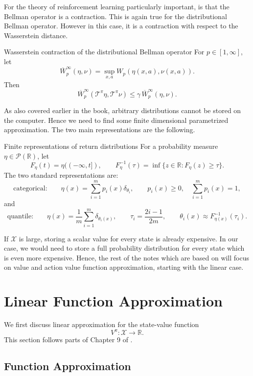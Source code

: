 \documentclass[12pt]{article}
\newcommand{\R}{\mathbb{R}}
\newcommand{\p}{\mathcal{P}}
\newcommand{\1}{\mathds{1}}
\newcommand{\X}{\mathcal{X}}
\newcommand{\T}{\mathcal{T}}
\begin{document}
For the theory of reinforcement learning particularly important, is that the Bellman operator is a contraction. This is again true for the distributional Bellman operator. However in this case, it is a contraction with respect to the Wasserstein distance.

\begin{theorem}{Wasserstein contraction of the distributional Bellman operator}{}
For $p\in[1,\infty]$, let
$$
  \overline W^\infty_p(\eta,\nu)
  =
  \sup_{x,a}
  W_p(\eta(x,a),\nu(x,a)).
$$
Then
$$
  \overline W^\infty_p(\T^\pi\eta,\T^\pi\nu)
  \leq
  \gamma\,\overline W^\infty_p(\eta,\nu).
$$
\end{theorem}
As also covered earlier in the book, arbitrary distributions cannot be stored on the computer. Hence we need to find some finite dimensional parametrized approximation. 
The two main representations are the following.

\begin{definition}{Finite representations of return distributions}{}
For a probability measure $\eta\in\p(\R)$, let
$$
  F_\eta(t)=\eta((-\infty,t]),
  \qquad
  F_\eta^{-1}(\tau)=\inf\{z\in\R:F_\eta(z)\geq\tau\}.
$$
The two standard representations are:
$$
  \text{categorical:}\qquad
  \eta(x)=\sum_{i=1}^m p_i(x)\delta_{\theta_i},
  \qquad
  p_i(x)\geq0,\quad \sum_{i=1}^m p_i(x)=1,
$$
and
$$
  \text{quantile:}\qquad
  \eta(x)=\frac1m\sum_{i=1}^m\delta_{\theta_i(x)},
  \qquad
  \tau_i=\frac{2i-1}{2m},
  \qquad
  \theta_i(x)\approx F_{\eta(x)}^{-1}(\tau_i).
$$
\end{definition} 
\vspace*{0.5cm}
If $\X$ is large, storing a scalar value for every state is already expensive.
In our case, we would need to store a full probability distribution for every state which is even more expensive. 
Hence, the rest of the notes which are based on \cite{bellemare2023distributional} will focus on value and action value function approximation, starting with the linear case.

\section{Linear Function Approximation}
We first discuss linear approximation for the state-value function
$$
  V^\pi:\X\to\R.
$$
 This section follows parts of Chapter 9 of \cite{bellemare2023distributional}.

\subsection{Function Approximation}
\end{document}
